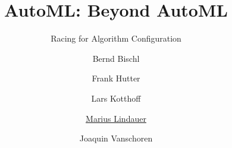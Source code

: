 


\title[AutoML: Racing]{AutoML: Beyond AutoML}
\subtitle{Racing for Algorithm Configuration}
\author[Marius Lindauer]{Bernd Bischl \and Frank Hutter \and Lars Kotthoff\newline \and \underline{Marius Lindauer} \and Joaquin Vanschoren}
\institute{}
\date{}




	
	\maketitle
	
